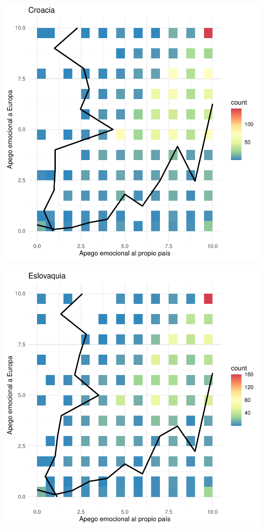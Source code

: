 \documentclass{article}
\begin{document}
\includegraphics{Informe-014}

\includegraphics{Informe-015}
\end{document}
